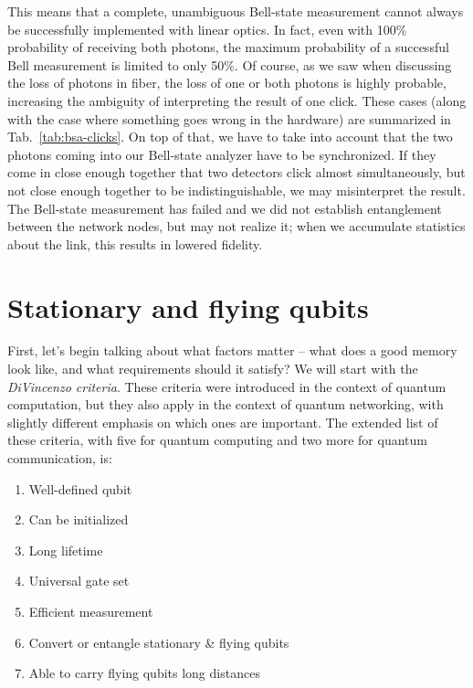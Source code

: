 This means that a complete, unambiguous Bell-state measurement cannot always be successfully implemented with linear optics. In fact, even with 100\% probability of receiving both photons, the maximum probability of a successful Bell measurement is limited to only 50\%.  Of course, as we saw when discussing the loss of photons in fiber, the loss of one or both photons is highly probable, increasing the ambiguity of interpreting the result of one click.  These cases (along with the case where something goes wrong in the hardware) are summarized in Tab.~\ref{tab:bsa-clicks}. 
On top of that, we have to take into account that the two photons coming into our Bell-state analyzer have to be synchronized. If they come in close enough together that two detectors click almost simultaneously, but not close enough together to be indistinguishable, we may misinterpret the result. The Bell-state measurement has failed and we did not establish entanglement between the network nodes, but may not realize it; when we accumulate statistics about the link, this results in lowered fidelity.


\section{Stationary and flying qubits}

First, let's begin talking about what factors matter -- what does a good memory look like, and what requirements should it satisfy?  We will start with the \emph{DiVincenzo criteria}. These criteria were introduced in the context of quantum computation, but they also apply in the context of quantum networking, with slightly different emphasis on which ones are important.  The extended list of these criteria, with five for quantum computing and two more for quantum communication, is:

\begin{enumerate}
    \item Well-defined qubit
    \item Can be initialized
    \item Long lifetime
    \item Universal gate set
    \item Efficient measurement
    \item Convert or entangle stationary \& flying qubits
    \item Able to carry flying qubits long distances
\end{enumerate}

